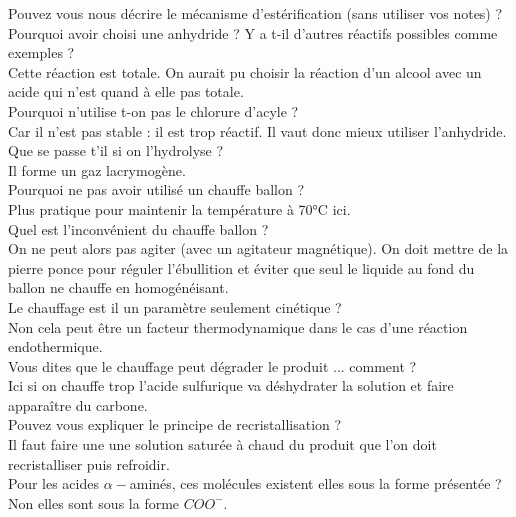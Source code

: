 \documentclass[12pt,prb,aps,epsf]{article}
\begin{document}
Pouvez vous nous décrire le mécanisme d'estérification (sans utiliser vos notes) ?\\

Pourquoi avoir choisi une anhydride ? Y a t-il d'autres réactifs possibles comme exemples ?\\
Cette réaction est totale. On aurait pu choisir la réaction d'un alcool avec un acide qui n'est  quand à elle pas totale.\\

Pourquoi n'utilise t-on pas le chlorure d'acyle ?\\
Car il n'est pas stable : il est trop réactif. Il vaut donc mieux utiliser l'anhydride.\\

Que se passe t'il si on l'hydrolyse ?\\
Il forme un gaz lacrymogène.\\

Pourquoi ne pas avoir utilisé un chauffe ballon ?\\
Plus pratique pour maintenir la température à 70°C ici.\\

Quel est l'inconvénient du chauffe ballon ?\\
On ne peut alors pas agiter (avec un agitateur magnétique). On doit mettre de la pierre ponce pour réguler l'ébullition et éviter que seul le liquide au fond du ballon ne chauffe en homogénéisant.\\

Le chauffage est il un paramètre seulement cinétique ?\\
Non cela peut être un facteur thermodynamique dans le cas d'une réaction endothermique.\\

Vous dites que le chauffage peut dégrader le produit ... comment ?\\
Ici si on chauffe trop l'acide sulfurique va déshydrater la solution et faire apparaître du carbone.\\

Pouvez vous expliquer le principe de recristallisation ?\\
Il faut faire une une solution saturée à chaud du produit que l'on doit recristalliser puis refroidir.\\

Pour les acides $\alpha-$aminés, ces molécules existent elles sous la forme présentée ?\\
Non elles sont sous la forme $COO^-$.
\end{document}
